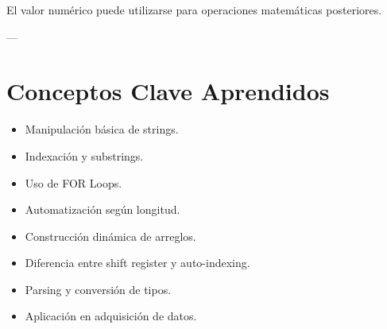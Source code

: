 \documentclass[12pt]{article}
\begin{document}
El valor numérico puede utilizarse para operaciones matemáticas posteriores.

---

\section*{Conceptos Clave Aprendidos}

\begin{itemize}
    \item Manipulación básica de strings.
    \item Indexación y substrings.
    \item Uso de FOR Loops.
    \item Automatización según longitud.
    \item Construcción dinámica de arreglos.
    \item Diferencia entre shift register y auto-indexing.
    \item Parsing y conversión de tipos.
    \item Aplicación en adquisición de datos.
\end{itemize}
\end{document}
